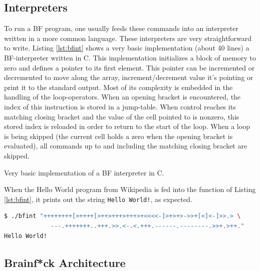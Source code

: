 \subsection{Interpreters}
To run a BF program, one usually feeds these commands into an interpreter written in a more common language. These interpreters are very straightforward to write. Listing \ref{lst:bfint} shows a very basic implementation (about 40 lines) a BF-interpreter written in C. This implementation initializes a block of memory to zero and defines a pointer to its first element. This pointer can be incremented or decremented to move along the array, increment/decrement value it's pointing or print it to the standard output. Most of its complexity is embedded in the handling of the loop-operators. When an opening bracket is encountered, the index of this instruction is stored in a jump-table. When control reaches its matching closing bracket and the value of the cell pointed to is nonzero, this stored index is reloaded in order to return to the start of the loop. When a loop is being skipped (the current cell holds a zero when the opening bracket is evaluated), all commands up to and including the matching closing bracket are skipped.

\begin{lstfloat}[H]
    
\caption{Very basic implementation of a BF interpreter in C.}
\label{lst:bfint}
\end{lstfloat}

When the Hello World program from Wikipedia \cite{bfwiki} is fed into the function of Listing \ref{lst:bfint}, it prints out the string \texttt{Hello World!}, as expected.
\vspace{0.5cm}
\begin{lstlisting}[language=bash]
  $ ./bfint "++++++++[>++++[>++>+++>+++>+<<<<-]>+>+>->>+[<]<-]>>.> \
             ---.+++++++..+++.>>.<-.<.+++.------.--------.>>+.>++."
Hello World!
\end{lstlisting}




\subsection{Brainf*ck Architecture}

